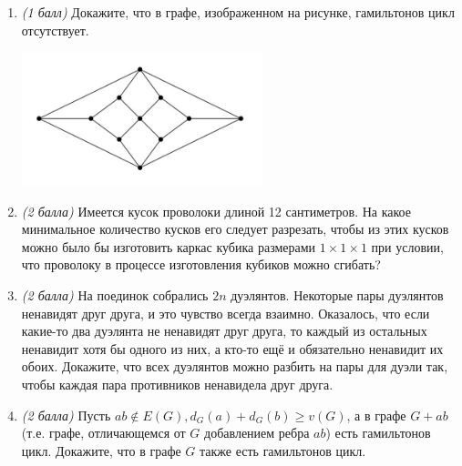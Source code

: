 \documentclass{article}
\begin{document}
\begin{enumerate}
    \item \textit{(1 балл)} Докажите, что в графе, изображенном на рисунке, гамильтонов цикл отсутствует.
    \begin{center}
        \includegraphics[width=7cm]{images/2.3.png}
    \end{center}
    
    \item \textit{(2 балла)} Имеется кусок проволоки длиной 12 сантиметров. На какое минимальное количество кусков его следует
    разрезать, чтобы из этих кусков можно было бы изготовить каркас кубика размерами $1\times1\times1$ при условии, что проволоку в процессе изготовления кубиков можно сгибать?
    
    \item \textit{(2 балла)} На поединок собрались $2n$ дуэлянтов. Некоторые пары дуэлянтов ненавидят друг друга, и это чувство всегда взаимно. Оказалось, что если какие-то два дуэлянта не ненавидят друг друга, то каждый из остальных ненавидит хотя бы одного из них, а кто-то ещё и обязательно ненавидит их обоих. Докажите, что всех дуэлянтов можно разбить на пары для дуэли так, чтобы каждая пара противников ненавидела друг друга.
    
    \item \textit{(2 балла)} Пусть $ab\notin E(G), d_G(a) + d_G(b)\geq v(G)$, а в графе $G + ab$ (т.е. графе, отличающемся от $G$ добавлением ребра $ab$) есть гамильтонов цикл. Докажите, что в графе $G$ также есть гамильтонов цикл.
    
\end{enumerate}
\end{document}
